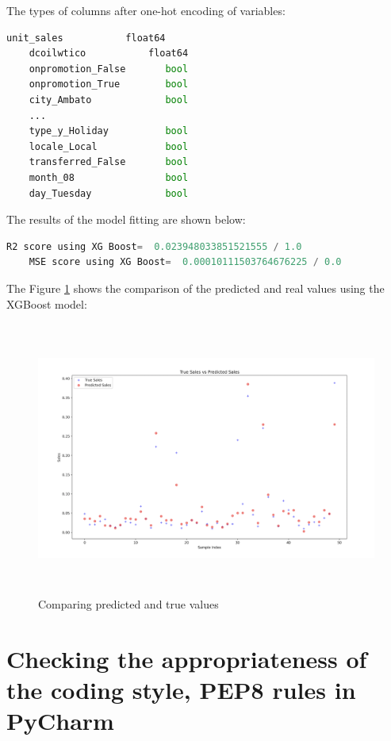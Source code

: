 The types of columns after one-hot encoding of variables:

\begin{lstlisting}[language=Python]
	unit_sales           float64
	dcoilwtico           float64
	onpromotion_False       bool
	onpromotion_True        bool
	city_Ambato             bool
	...   
	type_y_Holiday          bool
	locale_Local            bool
	transferred_False       bool
	month_08                bool
	day_Tuesday             bool
\end{lstlisting}

The results of the model fitting are shown below:

\begin{lstlisting}[language=Python]
	R2 score using XG Boost=  0.023948033851521555 / 1.0
	MSE score using XG Boost=  0.00010111503764676225 / 0.0
\end{lstlisting}

The Figure \ref{Prediction} shows the comparison of the predicted and real values using the XGBoost model:

\begin{center}
	\begin{figure}[h!]
		\begin{center}
			\includegraphics[height=90mm, width=130mm]{Images/Prediction.png}
		\end{center}
		\caption{Comparing predicted and true values}\label{Prediction}
	\end{figure}
\end{center}

\section{Checking the appropriateness of the coding style, PEP8 rules in PyCharm}

